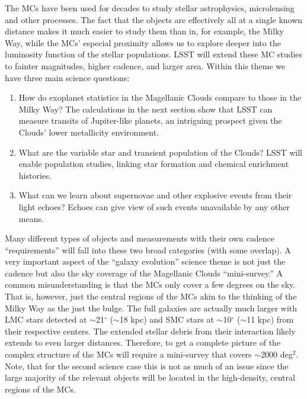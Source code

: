 The MCs have been
used for decades to study stellar astrophysics, microlensing and other
processes.  The fact that the objects are effectively all at a single
known distance makes it much easier to study them than in, for
example, the Milky Way, while the MCs' especial proximity allows us to explore deeper into the luminosity function of the stellar populations. LSST will extend these MC studies to fainter
magnitudes, higher cadence, and larger area. Within this theme we have three main science questions:
\begin{enumerate}

\item How do exoplanet statistics in the Magellanic Clouds compare to
those in the Milky Way?  The calculations in the next section show that
LSST can measure transits of Jupiter-like planets, an intriguing
prospect given the Clouds' lower metallicity environment.

\item What are the variable star and transient population of the Clouds?
LSST will enable population studies, linking star formation and chemical
enrichment histories.

\item What can we learn about supernovae and other explosive events from
their light echoes?  Echoes can give view of such events unavailable by
any other means.

\end{enumerate}


Many different types of objects and measurements with their own
cadence ``requirements'' will fall into these two broad categories
(with some overlap).
A very important aspect of the ``galaxy evolution'' science theme is
not just the cadence but also the sky coverage of the Magellanic
Clouds ``mini-survey.''  A common misunderstanding is that the MCs
only cover a few degrees on the sky.  That is, however, just the
central regions of the MCs akin to the thinking of the Milky Way as
the just the bulge.  The full galaxies are actually much larger with
LMC stars detected at $\sim$21$^{\circ}$ ($\sim$18 kpc) and SMC stars
at $\sim$10$^{\circ}$ ($\sim$11 kpc) from their respective centers.
The extended stellar debris from their interaction likely extends to
even larger distances.  Therefore, to get a complete picture of the
complex structure of the MCs will require a mini-survey that covers
$\sim$2000 deg$^2$.
Note, that for the second science case
this is not as much of an issue since the large majority of the
relevant objects will be located in the high-density, central regions
of the MCs.

